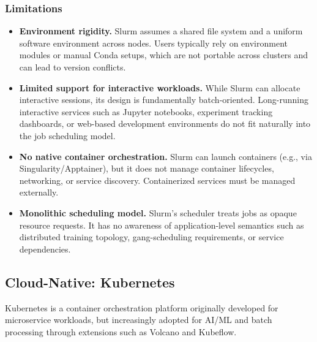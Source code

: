 \subsubsection{Limitations}

\begin{itemize}
    \item \textbf{Environment rigidity.} Slurm assumes a shared file system and a uniform software environment across nodes. Users typically rely on environment modules or manual Conda setups, which are not portable across clusters and can lead to version conflicts.

    \item \textbf{Limited support for interactive workloads.} While Slurm can allocate interactive sessions, its design is fundamentally batch-oriented. Long-running interactive services such as Jupyter notebooks, experiment tracking dashboards, or web-based development environments do not fit naturally into the job scheduling model.

    \item \textbf{No native container orchestration.} Slurm can launch containers (e.g., via Singularity/Apptainer), but it does not manage container lifecycles, networking, or service discovery. Containerized services must be managed externally.

    \item \textbf{Monolithic scheduling model.} Slurm's scheduler treats jobs as opaque resource requests. It has no awareness of application-level semantics such as distributed training topology, gang-scheduling requirements, or service dependencies.
\end{itemize}

\subsection{Cloud-Native: Kubernetes}

Kubernetes is a container orchestration platform originally developed for microservice workloads, but increasingly adopted for AI/ML and batch processing through extensions such as Volcano and Kubeflow.


